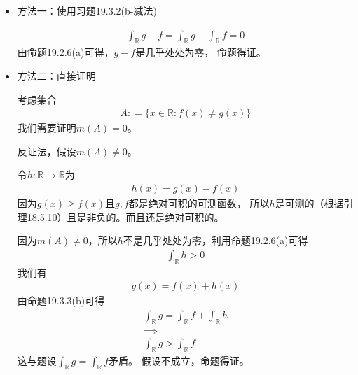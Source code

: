 \documentclass{article}
\begin{document}
\begin{itemize}
  \item 方法一：使用习题19.3.2(b-减法)

        \begin{align*}
          \int_{\mathbb{R}} g - f = \int_{\mathbb{R}} g - \int_{\mathbb{R}} f = 0
        \end{align*}
        由命题19.2.6(a)可得，$g - f$是几乎处处为零，
        命题得证。

  \item 方法二：直接证明

        考虑集合
        \begin{align*}
          A : = \{ x \in \mathbb{R} : f(x) \neq g(x) \}
        \end{align*}
        我们需要证明$m(A) = 0$。

        反证法，假设$m(A) \neq 0$。

        令$h: \mathbb{R} \to \mathbb{R}$为
        \begin{align*}
          h(x) = g(x) - f(x)
        \end{align*}
        因为$g(x) \geq f(x)$且$g, f$都是绝对可积的可测函数，
        所以$h$是可测的（根据引理18.5.10）且是非负的。而且还是绝对可积的。

        因为$m(A) \neq 0$，所以$h$不是几乎处处为零，利用命题19.2.6(a)可得
        \begin{align*}
          \int_{\mathbb{R}} h > 0
        \end{align*}
        我们有
        \begin{align*}
          g(x) = f(x) + h(x)
        \end{align*}
        由命题19.3.3(b)可得
        \begin{align*}
          \int_{\mathbb{R}} g = \int_{\mathbb{R}} f + \int_{\mathbb{R}} h \\
          \implies                                                        \\
          \int_{\mathbb{R}} g > \int_{\mathbb{R}} f
        \end{align*}
        这与题设$\int_{\mathbb{R}} g = \int_{\mathbb{R}} f$矛盾。
        假设不成立，命题得证。

\end{itemize}
\end{document}
